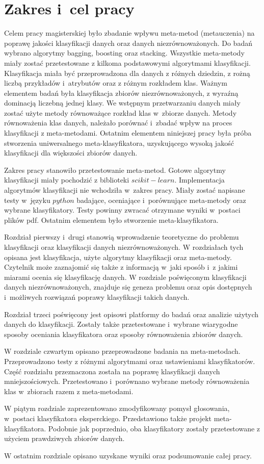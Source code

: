 \chapter*{Zakres i~cel pracy}
Celem pracy magisterskiej było zbadanie wpływu meta-metod (metauczenia) na poprawę jakości klasyfikacji danych oraz danych niezrównoważonych. Do badań wybrano algorytmy bagging, boosting oraz stacking. Wszystkie meta-metody miały zostać przetestowane z kilkoma podstawowymi algorytmami klasyfikacji. Klasyfikacja miała być przeprowadzona dla danych z różnych dziedzin, z rożną liczbą przykładów i~atrybutów oraz z różnym rozkładem klas. Ważnym elementem badań była klasyfikacja zbiorów niezrównoważonych, z wyraźną dominacją liczebną jednej klasy. We wstępnym przetwarzaniu danych miały zostać użyte metody równoważące rozkład klas w~zbiorze danych. Metody równoważenia klas danych, należało porównać i~zbadać wpływ na proces klasyfikacji z meta-metodami. Ostatnim elementem niniejszej pracy była próba stworzenia uniwersalnego meta-klasyfikatora, uzyskującego wysoką jakość klasyfikacji dla większości zbiorów danych. \par
Zakres pracy stanowiło przetestowanie meta-metod. Gotowe algorytmy klasyfikacji miały pochodzić z biblioteki $scikit-learn$. Implementacja algorytmów klasyfikacji nie wchodziła w~zakres pracy. Miały zostać napisane testy w~języku $python$ badające, oceniające i~porównujące meta-metody oraz wybrane klasyfikatory. Testy powinny zwracać otrzymane wyniki w~postaci plików pdf. Ostatnim elementem było stworzenie meta-klasyfikatora. \par
Rozdział pierwszy i~drugi stanowią wprowadzenie teoretyczne do problemu klasyfikacji oraz klasyfikacji danych niezrównoważonych. W rozdziałach tych opisana jest klasyfikacja, użyte algorytmy klasyfikacji oraz meta-metody. Czytelnik może zaznajomić się także z informacją w~jaki sposób i~z jakimi miarami ocenia się klasyfikację danych. W rozdziale poświęconym klasyfikacji danych niezrównoważonych, znajduje się geneza problemu oraz opis dostępnych i~możliwych rozwiązań poprawy klasyfikacji takich danych. \par
Rozdział trzeci poświęcony jest opisowi platformy do badań oraz analizie użytych danych do klasyfikacji. Zostały także przetestowane i~wybrane wiarygodne sposoby oceniania klasyfikatora oraz sposoby równoważenia zbiorów danych. \par
W rozdziale czwartym opisano przeprowadzone badania na meta-metodach. Przeprowadzono testy z różnymi algorytmami oraz ustawieniami klasyfikatorów. Część rozdziału przeznaczona została na poprawę klasyfikacji danych mniejszościowych. Przetestowano i~porównano wybrane metody równoważenia klas w~zbiorach razem z meta-metodami. \par
W piątym rozdziale zaprezentowano zmodyfikowany pomysł głosowania, w~postaci klasyfikatora eksperckiego. Przedstawiono także projekt meta-klasyfikatora. Podobnie jak poprzednio, oba klasyfikatory zostały przetestowane z użyciem prawdziwych zbiorów danych. \par
W ostatnim rozdziale opisano uzyskane wyniki oraz podsumowanie całej pracy.